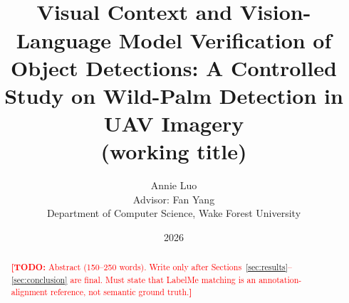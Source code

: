 \documentclass[11pt]{article}
\title{%
  \TODO{Final title}\\[0.5em]
  \large Visual Context and Vision-Language Model Verification of\\
  Object Detections: A Controlled Study on Wild-Palm Detection in UAV Imagery\\
  \normalsize(working title)}
\author{Annie Luo\\[0.25em]
  \small Advisor: Fan Yang\\
  \small Department of Computer Science, Wake Forest University}
\date{\TODO{Submission date} 2026}
\newcommand{\TODO}[1]{\textcolor{red}{\textbf{[TODO:} #1\textbf{]}}}
\renewcommand{\_}{\origunderscore\allowbreak}
\newif\ifcitations
\begin{document}
\maketitle

\begin{abstract}
\TODO{Abstract (150--250 words). Write only after Sections~\ref{sec:results}--\ref{sec:conclusion} are final. Must state that LabelMe matching is an annotation-alignment reference, not semantic ground truth.}
\end{abstract}

\tableofcontents
\newpage








\ifcitations
  
  
\fi

\appendix

\end{document}
